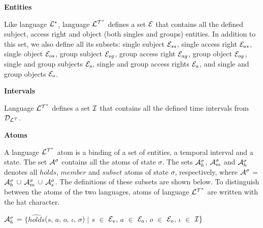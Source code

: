 \documentclass[11pt]{report}
\newenvironment{vquote}
{
  \begin{list}{}{\leftmargin 1em}\item[]
}
{
  \end{list}
}
\begin{document}
          \begin{itemize}
            \item
              {\bf Entities}

              Like language ${\cal L^*}$, language ${\cal L^{T^*}}$ defines
              a set ${\cal E}$ that contains all the defined subject, access
              right and object (both singles and groups) entities. In addition
              to this set, we also define all its subsets: single subject
              ${\cal E}_{ss}$, single access right ${\cal E}_{as}$, single
              object ${\cal E}_{os}$, group subject ${\cal E}_{sg}$, group
              access right ${\cal E}_{ag}$, group object ${\cal E}_{og}$,
              single and group subjects ${\cal E}_{s}$, single and group access
              rights ${\cal E}_{a}$, and single and group objects
              ${\cal E}_{o}$.

            \item
              {\bf Intervals}

              Language ${\cal L^{T^*}}$ defines a set ${\cal I}$ that contains
              all the defined time intervals from ${\cal D_{L^T}}$.

            \item
              {\bf Atoms}

              A language ${\cal L^{T^*}}$ atom is a binding of a set of
              entities, a temporal interval and a state. The set
              ${\cal A}^\sigma$ contains all the atoms of state $\sigma$.
              The sets ${\cal A}^{\sigma}_{h}$, ${\cal A}^{\sigma}_{m}$ and
              ${\cal A}^{\sigma}_{h}$ denotes all $holds$, $member$ and
              $subset$ atoms of state $\sigma$, respectively, where
              ${\cal A}^\sigma$ = ${\cal A}^{\sigma}_{h}$ $\cup$
              ${\cal A}^{\sigma}_{m}$ $\cup$ ${\cal A}^{\sigma}_{s}$. The
              definitions of these subsets are shown below. To distinguish
              between the atoms of the two languages, atoms of language
              ${\cal L^{T^*}}$ are written with the hat character.

              \begin{vquote}
                ${\cal A}^{\sigma}_{h}$ =
                  $\{\hat{holds}$($s$, $a$, $o$, $\iota$, $\sigma$) $\mid$
                  $s$ $\in$ ${\cal E}_{s}$,
                  $a$ $\in$ ${\cal E}_{a}$,
                  $o$ $\in$ ${\cal E}_{o}$,
                  $\iota$ $\in$ ${\cal I}\}$


\end{vquote}
\end{itemize}
\end{document}
